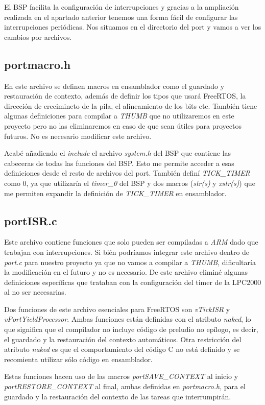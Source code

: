 El BSP facilita la configuración de interrupciones y gracias a la ampliación realizada en el apartado anterior tenemos una forma fácil de configurar las interrupciones periódicas. Nos situamos en el directorio del port y vamos a ver los cambios por archivos.

\subsection{portmacro.h}
En este archivo se definen macros en ensamblador como el guardado y restauración de contexto, además de definir los tipos que usará FreeRTOS, la dirección de crecimineto de la pila, el alineamiento de los bits etc. También tiene algunas definiciones para compilar a \emph{THUMB} que no utilizaremos en este proyecto pero no las eliminaremos en caso de que sean útiles para proyectos futuros. No es necesario modificar este archivo.

Acabé añadiendo el \emph{include} el archivo \emph{system.h} del BSP que contiene las cabeceras de todas las funciones del BSP. Esto me permite acceder a esas definiciones desde el resto de archivos del port. También definí \emph{TICK\_TIMER} como 0, ya que utilizaría el \emph{timer\_0} del BSP y dos macros (\emph{str(s)} y \emph{xstr(s)}) que me permiten expandir la definición de \emph{TICK\_TIMER} en ensamblador.

\subsection{portISR.c}
Este archivo contiene funciones que solo pueden ser compiladas a \emph{ARM} dado que trabajan con interrupciones. Si bién podríamos integrar este archivo dentro de \emph{port.c} para nuestro proyecto ya que no vamos a compilar a \emph{THUMB}, dificultaría la modificación en el futuro y no es necesario. De este archivo eliminé algunas definiciones específicas que trataban con la configuración del timer de la LPC2000 al no ser necesarias.

Dos funciones de este archivo esenciales para FreeRTOS son \emph{vTickISR} y \emph{vPortYieldProcessor}. Ambas funciones están definidas con el atributo \emph{naked}, lo que significa que el compilador no incluye código de preludio no epílogo, es decir, el guardado y la restauración del contexto automáticos. Otra restricción del atributo \emph{naked} es que el comportamiento del código C no está definido y se recomienta utilizar sólo código en ensamblador.

Estas funciones hacen uso de las macros \emph{portSAVE\_CONTEXT} al inicio y \emph{portRESTORE\_CONTEXT} al final, ambas definidas en \emph{portmacro.h}, para el guardado y la restauración del contexto de las tareas que interrumpirán.


